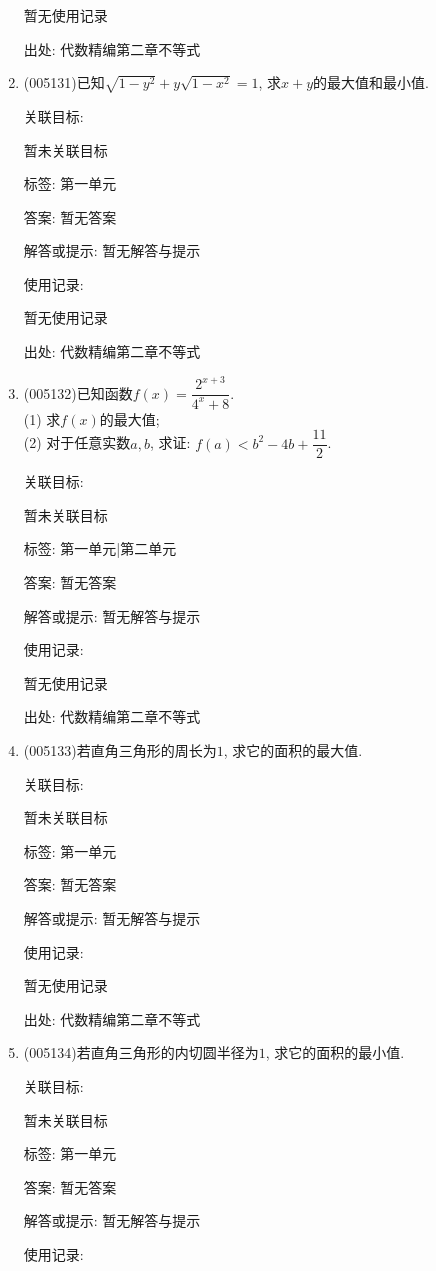 \documentclass[10pt,a4paper]{article}
\begin{document}
\begin{enumerate}[1.]
暂无使用记录


出处: 代数精编第二章不等式
\item { (005131)}已知$\sqrt{1-y^2}+y\sqrt{1-x^2}=1$, 求$x+y$的最大值和最小值.


关联目标:

暂未关联目标



标签: 第一单元

答案: 暂无答案

解答或提示: 暂无解答与提示

使用记录:

暂无使用记录


出处: 代数精编第二章不等式
\item { (005132)}已知函数$f(x)=\dfrac{2^{x+3}}{{4^x}+8}$.\\
(1) 求$f(x)$的最大值;\\
(2) 对于任意实数$a,b$, 求证: $f(a)<b^2-4b+\dfrac{11}2$.


关联目标:

暂未关联目标



标签: 第一单元|第二单元

答案: 暂无答案

解答或提示: 暂无解答与提示

使用记录:

暂无使用记录


出处: 代数精编第二章不等式
\item { (005133)}若直角三角形的周长为$1$, 求它的面积的最大值.


关联目标:

暂未关联目标



标签: 第一单元

答案: 暂无答案

解答或提示: 暂无解答与提示

使用记录:

暂无使用记录


出处: 代数精编第二章不等式
\item { (005134)}若直角三角形的内切圆半径为$1$, 求它的面积的最小值.


关联目标:

暂未关联目标



标签: 第一单元

答案: 暂无答案

解答或提示: 暂无解答与提示

使用记录:


\end{enumerate}
\end{document}
